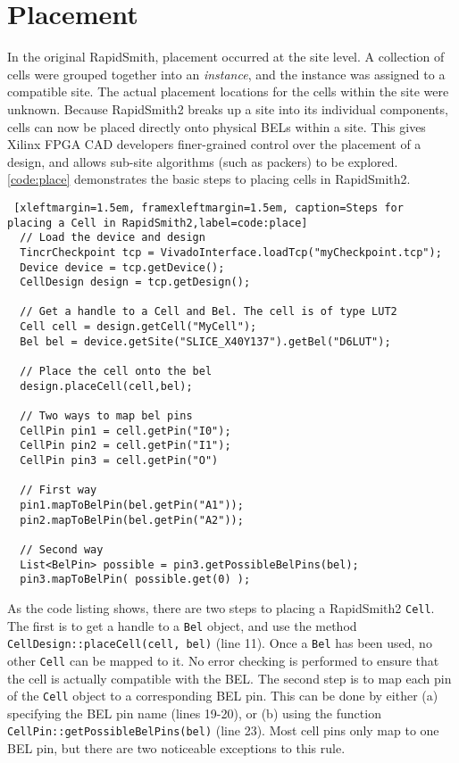 \newpage
\section{Placement} \label{sec:placement}

In the original RapidSmith, placement occurred at the site level. A
collection of cells were grouped together into an \textit{instance}, and the
instance was assigned to a compatible site. The actual placement locations
for the cells within the site were unknown. Because RapidSmith2 breaks up a
site into its individual components, cells can now be placed directly onto
physical BELs within a site. This gives Xilinx FPGA CAD developers finer-grained
control over the placement of a design, and allows sub-site algorithms (such as
packers) to be explored. \autoref{code:place} demonstrates the basic steps to
placing cells in RapidSmith2.

\begin{lstlisting} [xleftmargin=1.5em, framexleftmargin=1.5em, caption=Steps for
placing a Cell in RapidSmith2,label=code:place]
  // Load the device and design
  TincrCheckpoint tcp = VivadoInterface.loadTcp("myCheckpoint.tcp"); 
  Device device = tcp.getDevice();
  CellDesign design = tcp.getDesign();

  // Get a handle to a Cell and Bel. The cell is of type LUT2 
  Cell cell = design.getCell("MyCell"); 
  Bel bel = device.getSite("SLICE_X40Y137").getBel("D6LUT");

  // Place the cell onto the bel
  design.placeCell(cell,bel);

  // Two ways to map bel pins
  CellPin pin1 = cell.getPin("I0");
  CellPin pin2 = cell.getPin("I1");
  CellPin pin3 = cell.getPin("O")

  // First way
  pin1.mapToBelPin(bel.getPin("A1"));
  pin2.mapToBelPin(bel.getPin("A2"));

  // Second way
  List<BelPin> possible = pin3.getPossibleBelPins(bel);
  pin3.mapToBelPin( possible.get(0) );
\end{lstlisting}

As the code listing shows, there are two steps to placing a RapidSmith2
\texttt{Cell}. The first is to get a handle to a \texttt{Bel}
object, and use the method \texttt{CellDesign::placeCell(cell, bel)} (line
11). Once a \texttt{Bel} has been used, no other \texttt{Cell} can be mapped to
it. No error checking is performed to ensure that the cell is actually
compatible with the BEL. The second step is to map each pin of the \texttt{Cell}
object to a corresponding BEL pin. This can be done by either (a)
specifying the BEL pin name (lines 19-20), or (b) using the function
\texttt{CellPin::getPossibleBelPins(bel)} (line 23). Most cell pins only map to
one BEL pin, but there are two noticeable exceptions to this rule.


